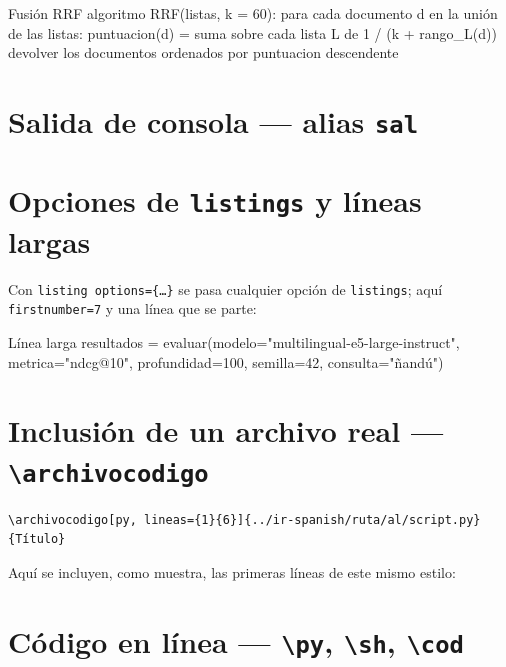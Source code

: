 \documentclass[11pt,letterpaper]{book}
\begin{document}
\begin{codigo}[seudo]{Fusión RRF}
algoritmo RRF(listas, k = 60):
    para cada documento d en la unión de las listas:
        puntuacion(d) = suma sobre cada lista L de 1 / (k + rango_L(d))
    devolver los documentos ordenados por puntuacion descendente
\end{codigo}

\section{Salida de consola --- alias \texttt{sal}}


\section{Opciones de \texttt{listings} y líneas largas}

Con \texttt{listing options=\{\ldots\}} se pasa cualquier opción de
\texttt{listings}; aquí \texttt{firstnumber=7} y una línea que se parte:

\begin{codigo}[listing options={style=python, firstnumber=7}]{Línea larga}
resultados = evaluar(modelo="multilingual-e5-large-instruct", metrica="ndcg@10", profundidad=100, semilla=42, consulta="ñandú")
\end{codigo}

\section{Inclusión de un archivo real --- \texttt{\textbackslash archivocodigo}}

\begin{verbatim}
\archivocodigo[py, lineas={1}{6}]{../ir-spanish/ruta/al/script.py}{Título}
\end{verbatim}

Aquí se incluyen, como muestra, las primeras líneas de este mismo estilo:


\section{Código en línea --- \texttt{\textbackslash py}, \texttt{\textbackslash sh}, \texttt{\textbackslash cod}}
\end{document}
